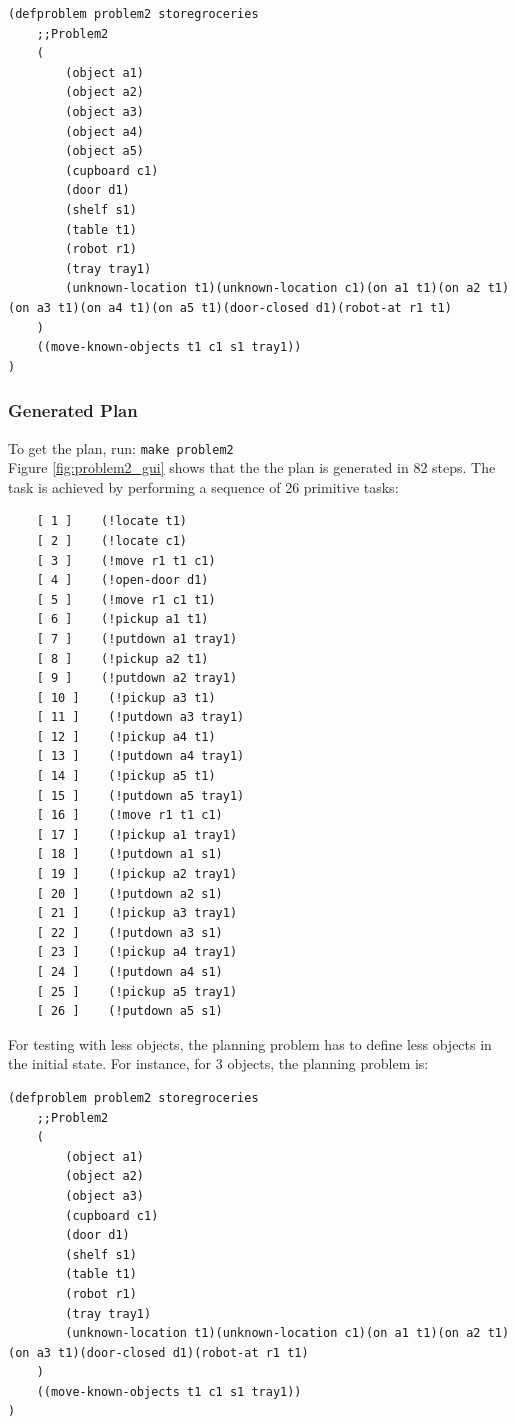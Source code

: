 \documentclass[paper=a4, fontsize=11pt]{scrartcl}
\begin{document}
	\begin{lstlisting}
(defproblem problem2 storegroceries
	;;Problem2
	(
		(object a1)
		(object a2)
		(object a3)
		(object a4)
		(object a5)
		(cupboard c1)
		(door d1)
		(shelf s1)
		(table t1)
		(robot r1)
		(tray tray1)
		(unknown-location t1)(unknown-location c1)(on a1 t1)(on a2 t1)(on a3 t1)(on a4 t1)(on a5 t1)(door-closed d1)(robot-at r1 t1)
	)
	((move-known-objects t1 c1 s1 tray1))
)
	\end{lstlisting}
	
	\subsubsection*{Generated Plan}
	
	To get the plan, run: \verb|make problem2| \\
	
	Figure \ref{fig:problem2_gui} shows that the the plan is generated in 82 steps. The task is achieved by performing a sequence of 26 primitive tasks: \\
	
	\begin{lstlisting}
	[ 1 ]    (!locate t1)
	[ 2 ]    (!locate c1)
	[ 3 ]    (!move r1 t1 c1)
	[ 4 ]    (!open-door d1)
	[ 5 ]    (!move r1 c1 t1)
	[ 6 ]    (!pickup a1 t1)
	[ 7 ]    (!putdown a1 tray1)
	[ 8 ]    (!pickup a2 t1)
	[ 9 ]    (!putdown a2 tray1)
	[ 10 ]    (!pickup a3 t1)
	[ 11 ]    (!putdown a3 tray1)
	[ 12 ]    (!pickup a4 t1)
	[ 13 ]    (!putdown a4 tray1)
	[ 14 ]    (!pickup a5 t1)
	[ 15 ]    (!putdown a5 tray1)
	[ 16 ]    (!move r1 t1 c1)
	[ 17 ]    (!pickup a1 tray1)
	[ 18 ]    (!putdown a1 s1)
	[ 19 ]    (!pickup a2 tray1)
	[ 20 ]    (!putdown a2 s1)
	[ 21 ]    (!pickup a3 tray1)
	[ 22 ]    (!putdown a3 s1)
	[ 23 ]    (!pickup a4 tray1)
	[ 24 ]    (!putdown a4 s1)
	[ 25 ]    (!pickup a5 tray1)
	[ 26 ]    (!putdown a5 s1)
	\end{lstlisting}
	
	For testing with less objects, the planning problem has to define less objects in the initial state. For instance, for 3 objects, the planning problem is: 
	
	\begin{lstlisting}
(defproblem problem2 storegroceries
	;;Problem2
	(
		(object a1)
		(object a2)
		(object a3)
		(cupboard c1)
		(door d1)
		(shelf s1)
		(table t1)
		(robot r1)
		(tray tray1)
		(unknown-location t1)(unknown-location c1)(on a1 t1)(on a2 t1)(on a3 t1)(door-closed d1)(robot-at r1 t1)
	)
	((move-known-objects t1 c1 s1 tray1))
)
	\end{lstlisting}
	
\end{document}
